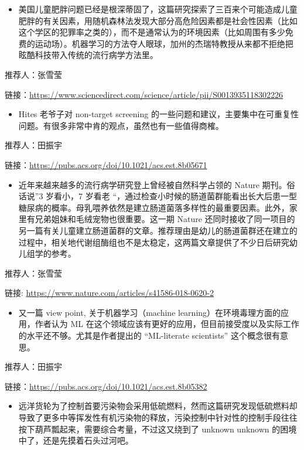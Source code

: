 \documentclass[
]{book}
\providecommand{\tightlist}{%
  \setlength{\itemsep}{0pt}\setlength{\parskip}{0pt}}
\begin{document}
\begin{itemize}
\tightlist
\item
  美国儿童肥胖问题已经是根深蒂固了，这篇研究探索了三百来个可能造成儿童肥胖的有关因素，用随机森林法发现大部分高危险因素都是社会性因素（比如这个学区的犯罪率之类的），而不是通常认为的环境因素（比如周围有多少免费的运动场）。机器学习的方法夺人眼球，加州的杰瑞特教授从来都不拒绝把眩酷科技带入传统的流行病学方法里。
\end{itemize}

推荐人：张雪莹

链接：\url{https://www.sciencedirect.com/science/article/pii/S0013935118302226}

\begin{itemize}
\tightlist
\item
  Hites 老爷子对 non-target screening 的一些问题和建议，主要集中在可重复性问题。有很多非常中肯的观点，虽然也有一些值得商榷。
\end{itemize}

推荐人：田振宇

链接：\url{https://pubs.acs.org/doi/10.1021/acs.est.8b05671}

\begin{itemize}
\tightlist
\item
  近年来越来越多的流行病学研究登上曾经被自然科学占领的 Nature 期刊。俗话说''3 岁看小，7 岁看老 ``，通过检查小时候的肠道菌群能看出长大后患一型糖尿病的概率。母乳喂养依然是建立肠道菌落多样性的最重要因素。此外，家里有兄弟姐妹和毛绒宠物也很重要。这一期 Nature 还同时接收了同一项目的另一篇有关儿童建立肠道菌群的文章。推荐理由是幼儿的肠道菌群还在建立的过程中，相关地代谢组酶组也不是太稳定，这两篇文章提供了不少日后研究幼儿组学的参考。
\end{itemize}

推荐人：张雪莹

链接: \url{https://www.nature.com/articles/s41586-018-0620-2}

\begin{itemize}
\tightlist
\item
  又一篇 view point, 关于机器学习（machine learning）在环境毒理方面的应用，作者认为 ML 在这个领域应该有更好的应用，但目前接受度以及实际工作的水平还不够。尤其是作者提出的 ``ML-literate scientists'' 这个概念很有意思。
\end{itemize}

推荐人：田振宇

链接：\url{https://pubs.acs.org/doi/10.1021/acs.est.8b05382}

\begin{itemize}
\tightlist
\item
  远洋货轮为了控制首要污染物会采用低硫燃料，然而这篇研究发现低硫燃料却导致了更多中等挥发性有机污染物的释放，污染控制中针对性的控制手段往往按下葫芦瓢起来，需要综合考量，不过这又绕到了 unknown unknown 的困境中了，还是先摸着石头过河吧。
\end{itemize}
\end{document}

